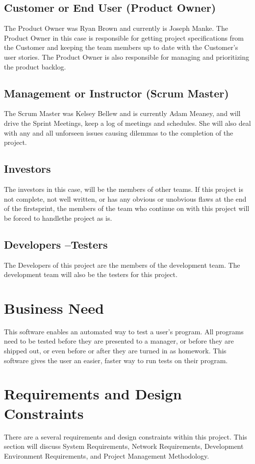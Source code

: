 \subsection{Customer or End User (Product Owner)}
The Product Owner was Ryan Brown and currently is Joseph Manke. The Product Owner in this case is responsible for getting project specifications from the Customer and keeping the team members up to date with the Customer's user stories. The Product Owner is also responsible for managing and prioritizing the product backlog.

\subsection{Management or Instructor (Scrum Master)}
The Scrum Master was Kelsey Bellew and is currently Adam Meaney, and will drive the Sprint Meetings, keep a log of meetings and schedules. She will also deal with any and all unforseen issues causing dilemmas to the completion of the project.

\subsection{Investors}
The investors in this case, will be the members of other teams. If this project is not complete, not well written, or has any obvious or unobvious flaws at the end of the firstsprint, the members of the team who continue on with this project will be forced to handlethe project as is.


\subsection{Developers --Testers}
The Developers of this project are the members of the development team. The development team will also be the testers for this project.


\section{Business Need}
This software enables an automated way to test a user's program. All programs need to be tested before they are presented to a manager, or before they are shipped out, or even before or after they are turned in as homework. This software gives the user an easier, faster way to run tests on their program.  

\section{Requirements and Design Constraints}
There are a several requirements and design constraints within this project. This section will discuss System Requirements, Network Requirements, Development Environment Requirements, and Project Management Methodology.


